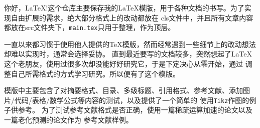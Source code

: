 你好，\LaTeX!这个仓库主要保存我的\LaTeX 模版，用于各种文档的书写。为了实现自由扩展的需求，绝大部分格式上的改动都放在
cls文件中，并且所有文章内容都放在src文件夹下，\verb!main.tex!只用于整理，作为顶层。

一直以来都习惯于使用他人提供的\TeX 模版，然而经常遇到一些细节上的改动想法却难以实现时，通常会选择妥协。
直到最近要写的文档较多，突然想起了\LaTeX 这个老朋友，使用过很多次却没能好好研究它，于是下定决心从零开始，通过
调整自己所需格式的方式学习研究。所以便有了这个模版。

模版中主要包含了对摘要格式、目录、多级标题、引用格式、参考文献、添加图片/代码/表格/数学公式等内容的测试，以及提供了一个简单的
使用\verb!Tikz!作图的例子供参考。
为了测试参考文献格式是否正确，使用一篇稀疏运算加速的论文以及一篇老化预测的论文作为
参考文献样例。